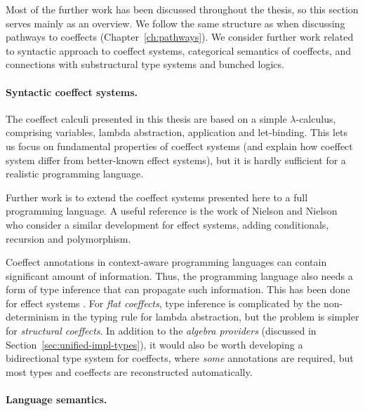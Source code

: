 Most of the further work has been discussed throughout the thesis, so this section
serves mainly as an overview. We follow the same structure as when discussing pathways to
coeffects (Chapter~\ref{ch:pathways}). We consider further work related to syntactic approach
to coeffect systems, categorical semantics of coeffects, and connections with substructural type
systems and bunched logics.


\paragraph{Syntactic coeffect systems.}
The coeffect calculi presented in this thesis are based on a simple $\lambda$-calculus, comprising
variables, lambda abstraction, application and let-binding. This lets us focus on fundamental
properties of coeffect systems (and explain how coeffect system differ from better-known effect
systems), but it is hardly sufficient for a realistic programming language.

Further work is to extend the coeffect systems presented here to a full programming language. A
useful reference is the work of Nielson and Nielson~\cite{effects-nielson} who consider a
similar development for effect systems, adding conditionals, recursion and polymorphism.

Coeffect annotations in context-aware programming languages can contain significant amount
of information. Thus, the programming language also needs a form of type inference that can propagate
such information. This has been done for effect systems \cite{effects-polymorphic}. For
\emph{flat coeffects}, type inference is complicated by the non-determinism in the typing rule
for lambda abstraction, but the problem is simpler for \emph{structural coeffects}. In addition
to the \emph{algebra providers} (discussed in Section~\ref{sec:unified-impl-types}), it would also
be worth developing a bidirectional type system \cite{types-bidirectional} for coeffects, where
\emph{some} annotations are required, but most types and coeffects are reconstructed automatically.


\paragraph{Language semantics.}

